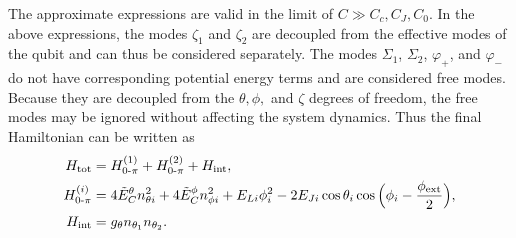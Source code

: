 \begin{widetext}
\begin{subequations}
\end{subequations}
The approximate expressions are valid in the limit of $C\gg C_c,C_J,C_0$.
In the above expressions, the modes $\zeta_1$ and $\zeta_2$ are decoupled from the effective modes of the \zps qubit and can thus be considered separately.
The modes $\Sigma_1$, $\Sigma_2$, $\varphi_+$, and $\varphi_-$ do not have corresponding potential energy terms and are considered free modes.
Because they are decoupled from the $\theta, \phi,$ and $\zeta$ degrees of freedom, the free modes may be ignored without affecting the system dynamics.
Thus the final Hamiltonian can be written as
\begin{subequations}
\begin{align}
    H_{\rm tot} &= H_{0\text{-}\pi}^{(1)} + H_{0\text{-}\pi}^{(2)} + H_{\rm int},
    \\
    H_{0\text{-}\pi}^{(i)} &=  4\tilde E_C^{\theta} n_{\theta i}^2 + 4\tilde E_C^{\phi} n_{\phi i}^2   +   E_{Li}\phi_i^2 - 2E_{Ji}\cos{\theta_i}\cos\Big (\phi_i - \frac{\phi_{\rm ext}}{2}\Big) ,
    \\
    H_{\rm int} &= g_{\theta} n_{\theta_1}n_{\theta_2}.
\end{align}
\end{subequations}


\end{widetext}
